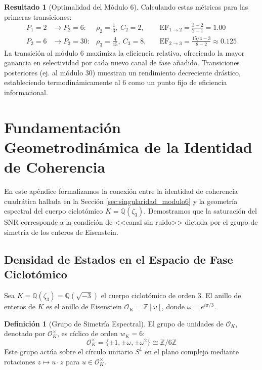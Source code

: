 \documentclass[12pt, a4paper]{article}
\theoremstyle{plain}
\theoremstyle{definition}
\newtheorem{definicion}[teorema]{Definición}
\newtheorem{resultado}[teorema]{Resultado} %
\theoremstyle{remark}
\begin{document}
\begin{resultado}[Optimalidad del Módulo 6]
Calculando estas métricas para las primeras transiciones:
\begin{align*}
    P_1=2 &\rightarrow P_2=6: & \rho_2=\frac{1}{3},\ C_2=2, &\quad \mathrm{EF}_{1\to2} = \frac{3 - 2}{2 - 1} = \mathbf{1.00} \\
    P_2=6 &\rightarrow P_3=30: & \rho_3=\frac{4}{15},\ C_3=8, &\quad \mathrm{EF}_{2\to3} = \frac{15/4 - 3}{8 - 2} \approx \mathbf{0.125}
\end{align*}
La transición al módulo 6 maximiza la eficiencia relativa, ofreciendo la mayor ganancia en selectividad por cada nuevo canal de fase añadido. Transiciones posteriores (ej. al módulo 30) muestran un rendimiento decreciente drástico, estableciendo termodinámicamente al 6 como un punto fijo de eficiencia informacional.
\end{resultado}

\section{Fundamentación Geometrodinámica de la Identidad de Coherencia}
\label{ap:geometrodinamica}

En este apéndice formalizamos la conexión entre la identidad de coherencia cuadrática hallada en la Sección \ref{sec:singularidad_modulo6} y la geometría espectral del cuerpo ciclotómico $K = \mathbb{Q}(\zeta_3)$. Demostramos que la saturación del SNR corresponde a la condición de <<canal sin ruido>> dictada por el grupo de simetría de los enteros de Eisenstein.

\subsection{Densidad de Estados en el Espacio de Fase Ciclotómico}

Sea $K = \mathbb{Q}(\zeta_3) = \mathbb{Q}(\sqrt{-3})$ el cuerpo ciclotómico de orden 3. El anillo de enteros de $K$ es el anillo de Eisenstein $\mathcal{O}_K = \mathbb{Z}[\omega]$, donde $\omega = e^{i\pi/3}$.

\begin{definicion}[Grupo de Simetría Espectral]
El grupo de unidades de $\mathcal{O}_K$, denotado por $\mathcal{O}_K^\times$, es cíclico de orden $w_K = 6$:
\[
\mathcal{O}_K^\times = \{ \pm 1, \pm \omega, \pm \omega^2 \} \cong \mathbb{Z}/6\mathbb{Z}
\]
Este grupo actúa sobre el círculo unitario $S^1$ en el plano complejo mediante rotaciones $z \mapsto u \cdot z$ para $u \in \mathcal{O}_K^\times$.
\end{definicion}
\end{document}
